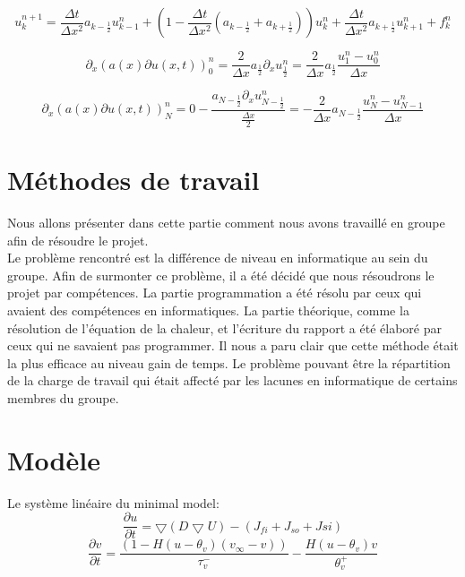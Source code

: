 \documentclass[a4paper,12pt,twoside]{report}
\begin{document}
$$u_k ^{n+1} = \frac{\Delta t}{ \Delta x ^2} a_{k-\frac{1}{2}} u_{k-1} ^n +(1- \frac{\Delta t}{\Delta x^2} (a_{k-\frac{1}{2}} + a_{k+\frac{1}{2}}))u_k ^ n +\frac{\Delta t}{\Delta x^2} a_{k+\frac{1}{2}} u_{k+1} ^n + f_k ^n$$

$$\partial_x(a(x) \partial u(x,t))_0 ^n = \frac{2}{\Delta x} a_{\frac{1}{2}} \partial_x u_{\frac{1}{2}} ^n = \frac{2}{\Delta x} a_{\frac{1}{2}} \frac{u_1 ^n - u_0 ^n}{\Delta x}$$

$$\partial_x(a(x) \partial u(x,t))_N ^n = 0 -\frac{a_{N-\frac{1}{2}} \partial_x u_{N-\frac{1}{2}} ^n}{\frac{\Delta x}{2}} = -\frac{2}{\Delta x} a_{N-\frac{1}{2}} \frac{u_N ^n - u_{N-1}^n}{\Delta x}$$

\smallbreak

\section{Méthodes de travail}


Nous allons présenter dans cette partie comment nous avons travaillé en groupe afin de résoudre le projet.\\ 
\hspace*{1cm} Le problème rencontré est la différence de niveau en informatique au sein du groupe. Afin de surmonter ce problème, il a été décidé que nous résoudrons le projet par compétences. La partie programmation a été résolu par ceux qui avaient des compétences en informatiques. La partie théorique, comme la résolution de l'équation de la chaleur, et l'écriture du rapport a été élaboré par ceux qui ne savaient pas programmer. Il nous a paru clair que cette méthode était la plus efficace au niveau gain de temps. Le problème pouvant être la répartition de la charge de travail qui était affecté par les lacunes en informatique de certains membres du groupe.\\
















\section{Modèle}




Le système linéaire du minimal model: 
\begin{equation}
\frac{\partial u}{\partial t}=\bigtriangledown( D \bigtriangledown U )-(J_{fi}+J_{so}+	J{si})
\end{equation}
\begin{equation}
\frac{\partial v}{\partial t}=\frac{(1-H(u-\theta_v)(v_\infty -v))}{\tau_v^-}-\frac{H(u-\theta_v)v}{\theta_v^+}
\end{equation}
\end{document}
